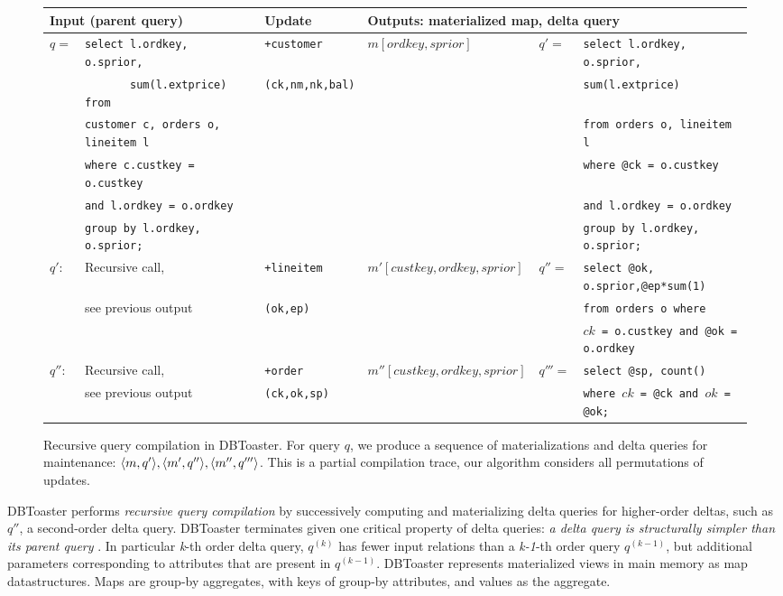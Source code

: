 \def \sql#1{{\scriptsize {\tt #1}}}
\begin{figure*}[htbp]

\vspace{-8mm}

\begin{tabular}{ll|l|l|ll}
\multicolumn{2}{l}{Input (parent query)}
& Update 
& \multicolumn{3}{l}{Outputs: materialized map, delta query}
\\
\hline
$q =$
& \sql{select l.ordkey, o.sprior,}
& \texttt{+customer}
& $m[ordkey,sprior]$
& $q' =$
& \sql{select l.ordkey, o.sprior,}
\\
& \sql{\ \ \ \ \ \ \ sum(l.extprice) from}
& \texttt{(ck,nm,nk,bal)}
& & & \sql{sum(l.extprice)}
\\
& \sql{customer c, orders o, lineitem l}
& & & & \sql{from orders o, lineitem l}
\\
& \sql{where c.custkey = o.custkey}
& & & & \sql{where @ck = o.custkey} 
\\
& \sql{and l.ordkey = o.ordkey}
& & & & \sql{and l.ordkey = o.ordkey}
\\
& \sql{group by l.ordkey, o.sprior;}
& & & & \sql{group by l.ordkey, o.sprior;}
\\
\hline
$q'$:
& Recursive call,
& \texttt{+lineitem} 
& $m'[custkey,ordkey,sprior]$
& $q'' =$ & \sql{select @ok, o.sprior,@ep*sum(1)}
\\
& see previous output
& \texttt{(ok,ep)} & & & \sql{from orders o where}
\\
& & & & & \sql{$ck$ = o.custkey and @ok = o.ordkey}
\\
\hline
$q''$:
& Recursive call,
& \texttt{+order} 
& $m''[custkey,ordkey,sprior]$
& $q'''=$ & \sql{select @sp, count()}
\\
& see previous output
& \texttt{(ck,ok,sp)}
& & & \sql{where $ck$ = @ck and $ok$ = @ok;}
\end{tabular}
\caption{Recursive query compilation in DBToaster. For query $q$, we produce a
sequence of materializations and delta queries for maintenance: ${\langle m,q'\rangle},
{\langle m',q''\rangle}, {\langle m'',q'''\rangle}$. This is a partial compilation trace, our
algorithm considers all permutations of updates.}
\label{fig:compex}
\vspace{-4mm}
\end{figure*}

DBToaster performs \textit{recursive query compilation} by successively
computing and materializing delta queries for higher-order deltas, such as
$q''$, a second-order delta query. DBToaster terminates given one critical
property of delta queries: \textit{a delta query is structurally simpler than its
parent query} \cite{koch-pods:10}. In particular \textit{k}-th order delta query, $q^{(k)}$ has fewer
input relations than a \textit{k-1}-th order query $q^{(k-1)}$, but additional
parameters corresponding to attributes that are present in $q^{(k-1)}$.
DBToaster represents materialized views in main memory as map datastructures.
Maps are group-by aggregates, with keys of group-by attributes, and values as
the aggregate.

